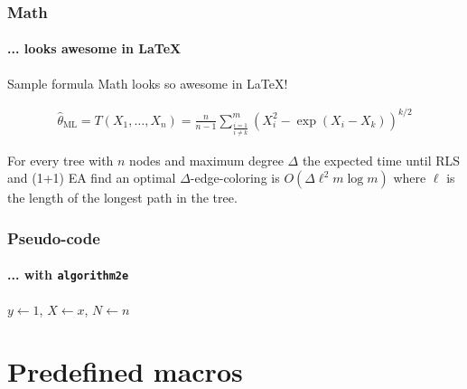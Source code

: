\documentclass[t,english]{beamer}
\begin{document}

\begin{frame}
  \frametitle{Math}
  \framesubtitle{... looks awesome in \LaTeX{}}

  \begin{block}{Sample formula}
    Math looks so \alert<2->{awesome} in \LaTeX{}!

    \begin{align*}
      \hat{\theta}_{\text{ML}} = T(X_1, \ldots, X_n) = \frac{n}{n-1} \sum_{\frac{i=1}{i \neq k}}^{m} \left(X_i^2 - \exp(X_i - X_k)\right)^{k/2}
    \end{align*}
  \end{block}

  \begin{theorem}
    For every tree with $n$ nodes and maximum degree $\Delta$ the expected time until RLS and (1+1) EA find an optimal $\Delta$-edge-coloring is $O(\Delta \ell^2 m \log m)$ where $\ell$ is the length of the longest path in the tree.
  \end{theorem}
\end{frame}



\begin{frame}[fragile]
  \frametitle{Pseudo-code}
  \framesubtitle{... with \texttt{algorithm2e}}

  \begin{algorithm}[H]
  \caption{Sample algorithm (taken from Overleaf docs)}\label{alg:sample_algorithm}
  $y \gets 1$, $X \gets x$, $N \gets n$\;
  \end{algorithm}

\end{frame}


\section{Predefined macros}
\end{document}
